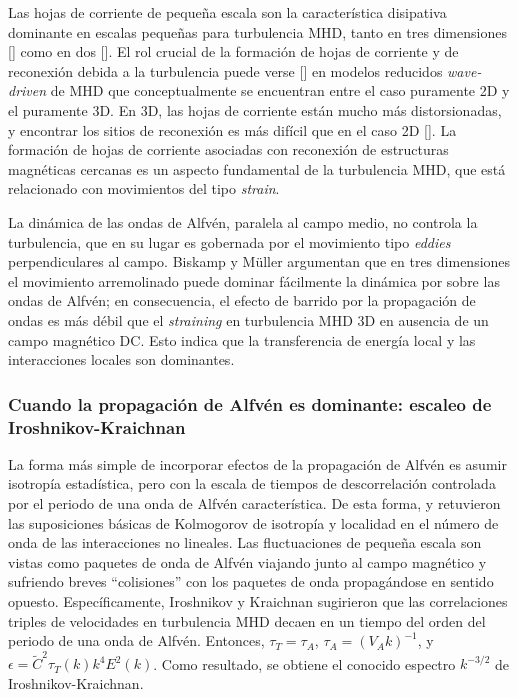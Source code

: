 Las hojas de corriente de pequeña escala son la característica
disipativa dominante en escalas pequeñas para turbulencia MHD, tanto
en tres dimensiones [\cite{biskamp_scaling_2000}] como en dos
[\cite{matthaeus_turbulent_1986}]. El rol crucial de la formación de
hojas de corriente y de reconexión debida a la turbulencia puede verse
[\cite{dmitruk_coronal_2002}] en modelos reducidos
\textit{wave-driven} de MHD que conceptualmente se encuentran entre el caso
puramente 2D y el puramente 3D. En 3D, las hojas de corriente están
mucho más distorsionadas, y encontrar los sitios de reconexión es más
difícil que en el caso 2D [\cite{politano_current_1995}]. La formación
de hojas de corriente asociadas con reconexión de estructuras
magnéticas cercanas es un aspecto fundamental de la turbulencia MHD,
que está relacionado con movimientos del tipo \textit{strain}.

La dinámica de las ondas de Alfvén, paralela al campo medio, no
controla la turbulencia, que en su lugar es gobernada por el
movimiento tipo \textit{eddies} perpendiculares al campo. Biskamp y
M\"uller argumentan que en tres dimensiones el movimiento arremolinado
puede dominar fácilmente la dinámica por sobre las ondas de Alfv\'en;
en consecuencia, el efecto de barrido por la propagación de ondas es
más débil que el \textit{straining} en turbulencia MHD 3D en ausencia
de un campo magnético DC. Esto indica que la transferencia de energía
local y las interacciones locales son dominantes.

\subsubsection{Cuando la propagación de Alfv\'en es dominante: escaleo de Iroshnikov-Kraichnan}\label{sec:escaleoI-K}

La forma más simple de incorporar efectos de la propagación de Alfv\'en
es asumir isotropía estadística, pero con la escala de tiempos de
descorrelación controlada por el periodo de una onda de Alfv\'en
característica.  De esta forma, \cite{iroshnikov_turbulence_1964} y
\cite{kraichnan_inertial-range_1965} retuvieron las suposiciones
básicas de Kolmogorov de isotropía y localidad en el número de onda de
las interacciones no lineales. Las fluctuaciones de pequeña escala son
vistas como paquetes de onda de Alfv\'en viajando junto al campo
magnético y sufriendo breves ``colisiones'' con los paquetes de onda
propagándose en sentido opuesto. Específicamente, Iroshnikov y
Kraichnan sugirieron que las correlaciones triples de velocidades en
turbulencia MHD decaen en un tiempo del orden del periodo de una onda
de Alfv\'en. Entonces, $\tau_T = \tau_A$, $\tau_A = (V_A k)^{-1}$, y
$\epsilon = \tilde{C}^2 \tau_T(k) k^4 E^2(k)$. Como resultado, se
obtiene el conocido espectro $k^{-3/2}$ de Iroshnikov-Kraichnan.

